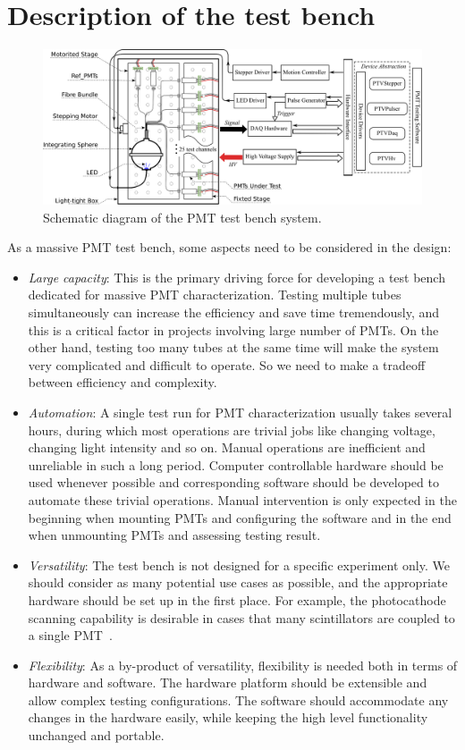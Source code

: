 \documentclass[preprint, times]{elsarticle}
\begin{document}
\section{Description of the test bench}
\label{sec:description}

\begin{figure}
 \centering
 \includegraphics[width=140mm]{FIG1}
\caption{Schematic diagram of the PMT test bench system.}
\label{fig:FIG1}
\end{figure}

As a massive PMT test bench, some aspects need to be considered in the design:
\begin{itemize}
 \item \textit{Large capacity}: This is the primary driving force for developing a test bench dedicated for massive PMT characterization.
 Testing multiple tubes simultaneously can increase the efficiency and save time tremendously, and this is a critical factor in projects involving large number of PMTs. 
 On the other hand, testing too many tubes at the same time will make the system very complicated and difficult to operate. 
 So we need to make a tradeoff between efficiency and complexity.
 \item \textit{Automation}: A single test run for PMT characterization usually takes several hours, during which most operations are trivial jobs like changing voltage, changing light intensity and so on.
 Manual operations are inefficient and unreliable in such a long period.
 Computer controllable hardware should be used whenever possible and corresponding software should be developed to automate these trivial operations.
 Manual intervention is only expected in the beginning when mounting PMTs and configuring the software and in the end when unmounting PMTs and assessing testing result. 
 \item \textit{Versatility}: The test bench is not designed for a specific experiment only. 
 We should consider as many potential use cases as possible, and the appropriate hardware should be set up in the first place.
 For example, the photocathode scanning capability is desirable in cases that many scintillators are coupled to a single PMT~\cite{tof_pet}. 
 \item \textit{Flexibility}: As a by-product of versatility, flexibility is needed both in terms of hardware and software.
 The hardware platform should be extensible and allow complex testing configurations.
 The software should accommodate any changes in the hardware easily, while keeping the high level functionality unchanged and portable. 
\end{itemize}
\end{document}
